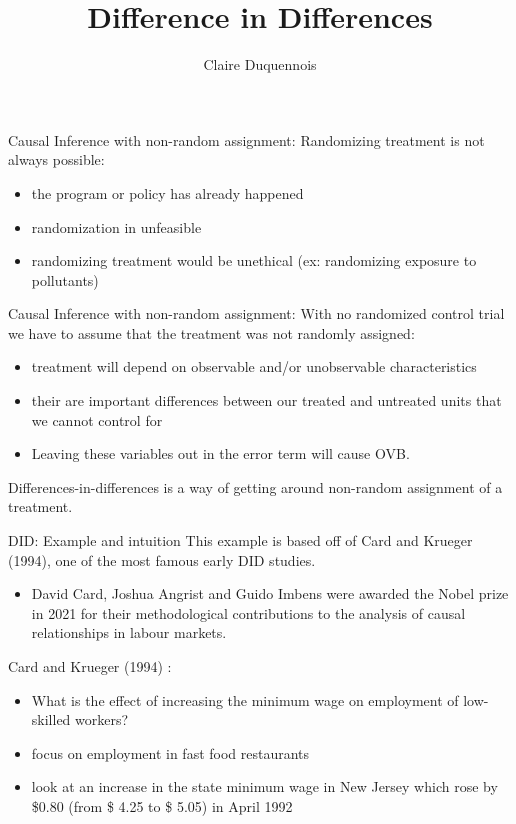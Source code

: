 \documentclass[
  ignorenonframetext,
]{beamer}
\title{Difference in Differences}
\author{Claire Duquennois}
\date{}
\providecommand{\tightlist}{%
  \setlength{\itemsep}{0pt}\setlength{\parskip}{0pt}}
\begin{document}
\frame{\titlepage}

\begin{frame}{Causal Inference with non-random assignment:}
\protect\hypertarget{causal-inference-with-non-random-assignment}{}
Randomizing treatment is not always possible:

\begin{itemize}
\item
  the program or policy has already happened
\item
  randomization in unfeasible
\item
  randomizing treatment would be unethical (ex: randomizing exposure to
  pollutants)
\end{itemize}
\end{frame}

\begin{frame}{Causal Inference with non-random assignment:}
\protect\hypertarget{causal-inference-with-non-random-assignment-1}{}
With no randomized control trial we have to assume that the treatment
was not randomly assigned:

\begin{itemize}
\item
  treatment will depend on observable and/or unobservable
  characteristics
\item
  their are important differences between our treated and untreated
  units that we cannot control for
\item
  Leaving these variables out in the error term will cause OVB.
\end{itemize}

Differences-in-differences is a way of getting around non-random
assignment of a treatment.
\end{frame}

\begin{frame}{DID: Example and intuition}
\protect\hypertarget{did-example-and-intuition}{}
This example is based off of Card and Krueger (1994), one of the most
famous early DID studies.

\begin{itemize}
\tightlist
\item
  David Card, Joshua Angrist and Guido Imbens were awarded the Nobel
  prize in 2021 for their methodological contributions to the analysis
  of causal relationships in labour markets.
\end{itemize}

Card and Krueger (1994) :

\begin{itemize}
\item
  What is the effect of increasing the minimum wage on employment of
  low-skilled workers?
\item
  focus on employment in fast food restaurants
\item
  look at an increase in the state minimum wage in New Jersey which rose
  by \$0.80 (from \$ 4.25 to \$ 5.05) in April 1992
\end{itemize}
\end{frame}
\end{document}
